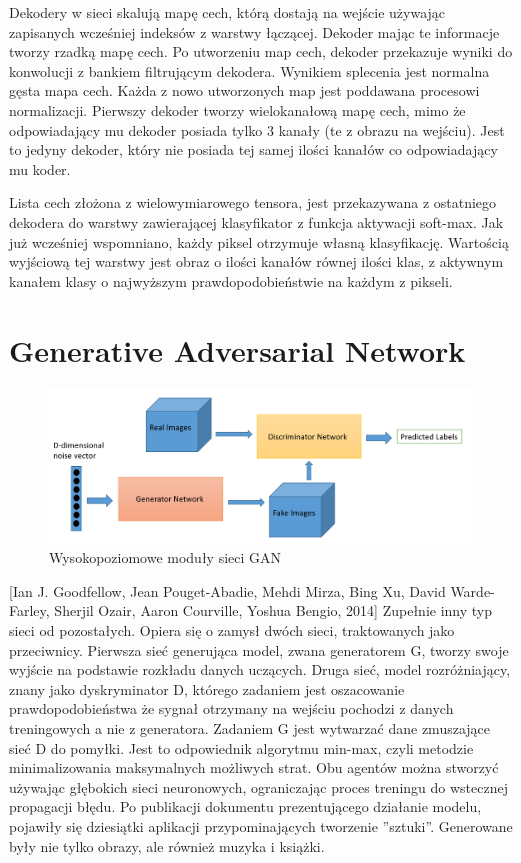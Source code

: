 \documentclass[12pt,a4paper,twoside,titlepage,openright]{book}
\begin{document}
Dekodery w sieci skalują mapę cech, którą dostają na wejście używając zapisanych wcześniej indeksów z warstwy łączącej. Dekoder mając te informacje tworzy rzadką mapę cech. Po utworzeniu map cech, dekoder przekazuje wyniki do konwolucji z bankiem filtrującym dekodera. Wynikiem splecenia jest normalna gęsta mapa cech. Każda z nowo utworzonych map jest poddawana procesowi normalizacji. Pierwszy dekoder tworzy wielokanałową mapę cech, mimo że odpowiadający mu dekoder posiada tylko 3 kanały (te z obrazu na wejściu). Jest to jedyny dekoder, który nie posiada tej samej ilości kanałów co odpowiadający mu koder.

Lista cech złożona z wielowymiarowego tensora, jest przekazywana z ostatniego dekodera do warstwy zawierającej klasyfikator z funkcja aktywacji soft-max. Jak już wcześniej wspomniano, każdy piksel otrzymuje własną klasyfikację. Wartością wyjściową tej warstwy jest obraz o ilości kanałów równej ilości klas, z aktywnym kanałem klasy o najwyższym prawdopodobieństwie na każdym z pikseli.

\cite{DBLP:journals/corr/BadrinarayananH15}

\section{Generative Adversarial Network}
\begin{figure}[ht]
	\centering
			\includegraphics[resolution=100,scale=0.36]{GAN.png}
		\caption{Wysokopoziomowe moduły sieci GAN}
\end{figure}

[Ian J. Goodfellow, Jean Pouget-Abadie, Mehdi Mirza, Bing Xu, David Warde-Farley, Sherjil Ozair, Aaron Courville, Yoshua Bengio, 2014] Zupełnie inny typ sieci od pozostałych. Opiera się o zamysł dwóch sieci, traktowanych jako przeciwnicy. Pierwsza sieć generująca model, zwana generatorem G, tworzy swoje wyjście na podstawie rozkładu danych uczących. Druga sieć, model rozróżniający, znany jako dyskryminator D, którego zadaniem jest oszacowanie prawdopodobieństwa że sygnał otrzymany na wejściu pochodzi z danych treningowych a nie z generatora. Zadaniem G jest wytwarzać dane zmuszające sieć D do pomyłki. Jest to odpowiednik algorytmu min-max, czyli metodzie minimalizowania maksymalnych możliwych strat. Obu agentów można stworzyć używając głębokich sieci neuronowych, ograniczając proces treningu do wstecznej propagacji błędu. Po publikacji dokumentu prezentującego działanie modelu, pojawiły się dziesiątki aplikacji przypominających tworzenie ''sztuki''. Generowane były nie tylko obrazy, ale również muzyka i książki. 
\end{document}
